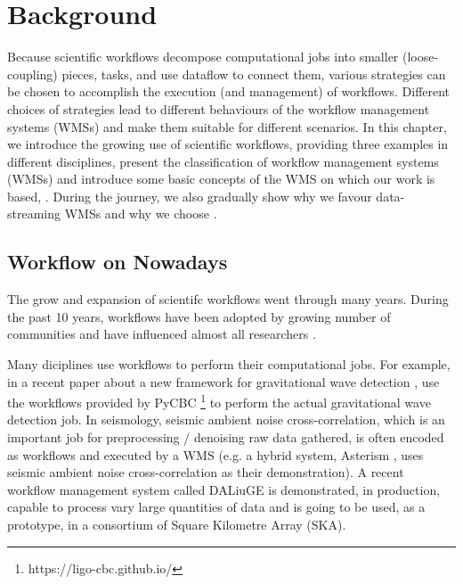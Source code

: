 \chapter{Background}
Because scientific workflows decompose computational jobs into smaller (loose-coupling) pieces, tasks, and use dataflow to connect them, various strategies can be chosen to accomplish the execution (and management) of workflows. Different choices of strategies lead to different behaviours of the workflow management systems (WMSs) and make them suitable for different scenarios. In this chapter, we introduce the growing use of scientific workflows, providing three examples in different disciplines, present the classification of workflow management systems (WMSs) and introduce some basic concepts of the WMS on which our work is based, \dpy. During the journey, we also gradually show why we favour data-streaming WMSs and why we choose \dpy.

\section{Workflow on Nowadays}
The grow and expansion of scientifc workflows went through many years. During the past 10 years, workflows have been adopted by growing number of communities and have influenced almost all researchers \cite{ATKINSON2017216}.

Many diciplines use workflows to perform their computational jobs. For example, in a recent paper about a new framework for gravitational wave detection \cite{gwave}, \citeauthor{gwave} use the workflows provided by PyCBC \footnote{https://ligo-cbc.github.io/} to perform the actual gravitational wave detection job. In seismology, seismic ambient noise cross-correlation, which is an important job for preprocessing / denoising raw data gathered, is often encoded as workflows and executed by a WMS (e.g. a hybrid system, Asterism \cite{Asterism}, uses seismic ambient noise cross-correlation as their demonstration). A recent workflow management system called DALiuGE \cite{wu2017daliuge} is demonstrated, in production, capable to process vary large quantities of data and is going to be used, as a prototype, in a consortium of Square Kilometre Array (SKA).

